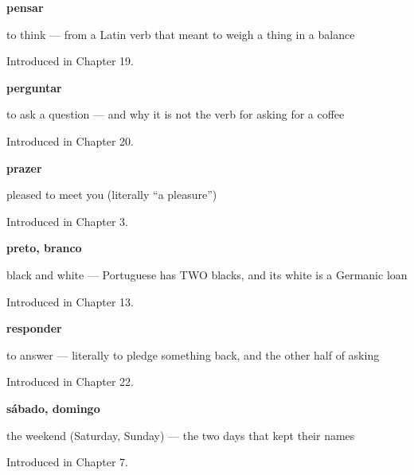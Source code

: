 \noindent\begin{minipage}[t]{\linewidth}
\raggedright
\textbf{pensar}\par
\small to think — from a Latin verb that meant to weigh a thing in a balance\par
\footnotesize Introduced in Chapter 19.
\end{minipage}\par\medskip

\noindent\begin{minipage}[t]{\linewidth}
\raggedright
\textbf{perguntar}\par
\small to ask a question — and why it is not the verb for asking for a coffee\par
\footnotesize Introduced in Chapter 20.
\end{minipage}\par\medskip

\noindent\begin{minipage}[t]{\linewidth}
\raggedright
\textbf{prazer}\par
\small pleased to meet you (literally \textquotedblleft{}a pleasure\textquotedblright{})\par
\footnotesize Introduced in Chapter 3.
\end{minipage}\par\medskip

\noindent\begin{minipage}[t]{\linewidth}
\raggedright
\textbf{preto, branco}\par
\small black and white — Portuguese has TWO blacks, and its white is a Germanic loan\par
\footnotesize Introduced in Chapter 13.
\end{minipage}\par\medskip

\noindent\begin{minipage}[t]{\linewidth}
\raggedright
\textbf{responder}\par
\small to answer — literally to pledge something back, and the other half of asking\par
\footnotesize Introduced in Chapter 22.
\end{minipage}\par\medskip

\noindent\begin{minipage}[t]{\linewidth}
\raggedright
\textbf{sábado, domingo}\par
\small the weekend (Saturday, Sunday) — the two days that kept their names\par
\footnotesize Introduced in Chapter 7.
\end{minipage}\par\medskip

